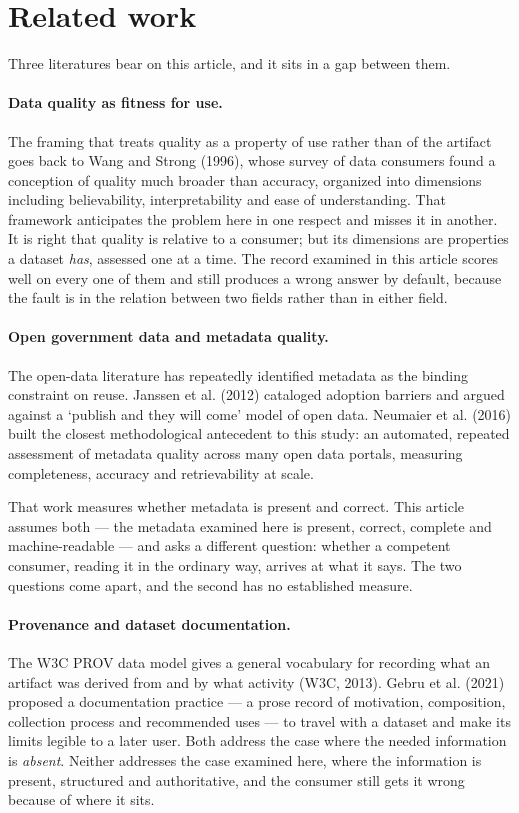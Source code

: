 \documentclass[11pt]{article}
\begin{document}
\section{Related work}

Three literatures bear on this article, and it sits in a gap between them.

\paragraph{Data quality as fitness for use.} The framing that treats quality as
a property of use rather than of the artifact goes back to Wang and Strong
(1996), whose survey of data consumers found a conception of quality much
broader than accuracy, organized into dimensions including believability,
interpretability and ease of understanding. That framework anticipates the
problem here in one respect and misses it in another. It is right that quality
is relative to a consumer; but its dimensions are properties a dataset
\emph{has}, assessed one at a time. The record examined in this article scores
well on every one of them and still produces a wrong answer by default, because
the fault is in the relation between two fields rather than in either field.

\paragraph{Open government data and metadata quality.} The open-data literature
has repeatedly identified metadata as the binding constraint on reuse. Janssen et al. (2012) cataloged adoption barriers and argued against a `publish and
they will come' model of open data. Neumaier et al. (2016) built the closest methodological
antecedent to this study: an automated, repeated assessment of metadata quality
across many open data portals, measuring completeness, accuracy and
retrievability at scale.

That work measures whether metadata is present and correct. This article
assumes both --- the metadata examined here is present, correct, complete and
machine-readable --- and asks a different question: whether a competent
consumer, reading it in the ordinary way, arrives at what it says. The two
questions come apart, and the second has no established measure.

\paragraph{Provenance and dataset documentation.} The W3C PROV data model gives
a general vocabulary for recording what an artifact was derived from and by
what activity (W3C, 2013). Gebru et al. (2021) proposed a
documentation practice --- a prose record of motivation, composition,
collection process and recommended uses --- to travel with a dataset and make
its limits legible to a later user. Both address
the case where the needed information is \emph{absent}. Neither addresses the
case examined here, where the information is present, structured and
authoritative, and the consumer still gets it wrong because of where it sits.
\end{document}

